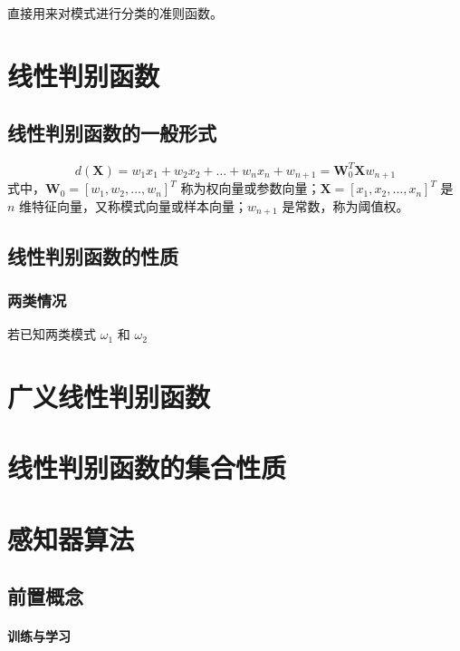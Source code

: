 \documentclass[11pt]{book}
\begin{document}
直接用来对模式进行分类的准则函数。

\section{线性判别函数}

\subsection{线性判别函数的一般形式}

$$
d(\mathbf X) = w_1x_1 + w_2x_2 + \ldots + w_nx_n + w_{n+1} = \mathbf{W}^T_0 \mathbf{X} w_{n+1}
$$
式中，$\mathbf{W}_0 = [w_1, w_2, \ldots, w_n]^T$ 称为权向量或参数向量；$\mathbf{X} = [x_1, x_2, \ldots, x_n]^T$ 是 $n$ 维特征向量，又称模式向量或样本向量；$w_{n+1}$ 是常数，称为阈值权。


\subsection{线性判别函数的性质}

\subsubsection{两类情况}%
\label{ssub:liang_lei_qing_kuang_}

若已知两类模式 $\omega_1$ 和 $\omega_2$

\section{广义线性判别函数}

\section{线性判别函数的集合性质}

\section{感知器算法}

\subsection{前置概念}

\paragraph{训练与学习}%
\label{par:xun_lian_yu_xue_xi_}
\end{document}
